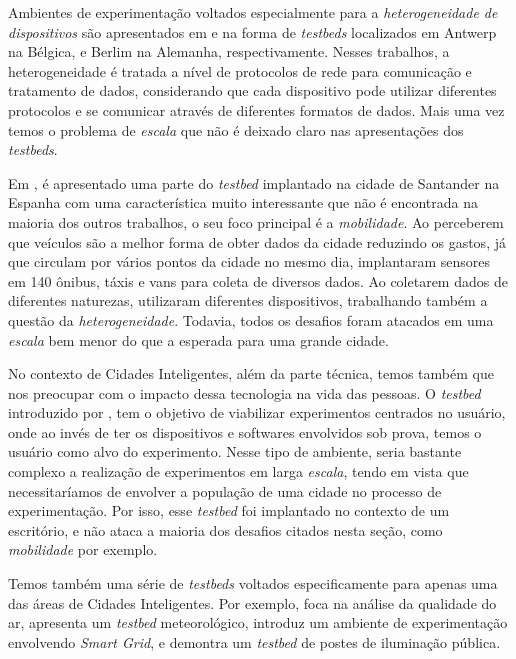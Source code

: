 Ambientes de experimentação voltados especialmente para a \textit{heterogeneidade de dispositivos} são apresentados em \cite{latre_2016} e \cite{juraschek_2012} na forma de \textit{testbeds} localizados
em Antwerp na Bélgica, e Berlim na Alemanha, respectivamente.
Nesses trabalhos, a heterogeneidade é tratada a nível de protocolos de rede para comunicação e tratamento de dados, considerando que cada dispositivo pode utilizar diferentes protocolos e se comunicar
através de diferentes formatos de dados.
Mais uma vez temos o problema de \textit{escala} que não é deixado claro nas apresentações dos \textit{testbeds}.

Em \cite{lanza_2015}, é apresentado uma parte do \textit{testbed} implantado na cidade de Santander na Espanha com uma característica muito interessante que não é encontrada na maioria dos outros
trabalhos, o seu foco principal é a \textit{mobilidade}.
Ao perceberem que veículos são a melhor forma de obter dados da cidade reduzindo os gastos, já que circulam por vários pontos da cidade no mesmo dia, implantaram sensores em 140 ônibus, táxis e vans
para coleta de diversos dados.
Ao coletarem dados de diferentes naturezas, utilizaram diferentes dispositivos, trabalhando também a questão da \textit{heterogeneidade}.
Todavia, todos os desafios foram atacados em uma \textit{escala} bem menor do que a esperada para uma grande cidade.

No contexto de Cidades Inteligentes, além da parte técnica, temos também que nos preocupar com o impacto dessa tecnologia na vida das pessoas.
O \textit{testbed} introduzido por \cite{nati_2013}, tem o objetivo de viabilizar experimentos centrados no usuário, onde ao invés de ter os dispositivos e softwares envolvidos sob prova, temos
o usuário como alvo do experimento.
Nesse tipo de ambiente, seria bastante complexo a realização de experimentos em larga \textit{escala}, tendo em vista que necessitaríamos de envolver a população de uma cidade no processo de
experimentação.
Por isso, esse \textit{testbed} foi implantado no contexto de um escritório, e não ataca a maioria dos desafios citados nesta seção, como \textit{mobilidade} por exemplo.

Temos também uma série de \textit{testbeds} voltados especificamente para apenas uma das áreas de Cidades Inteligentes.
Por exemplo, \cite{braem_2016} foca na análise da qualidade do ar, \cite{lee_2015} apresenta um \textit{testbed} meteorológico, \cite{lu_2010} introduz um ambiente de experimentação envolvendo
\textit{Smart Grid}, e \cite{amrutur_2017} demontra um \textit{testbed} de postes de iluminação pública.

